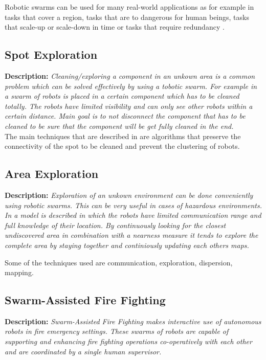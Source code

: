 Robotic swarms can be used for many real-world applications as for example in tasks that cover a region, tasks that are to dangerous for human beings, tasks that scale-up or scale-down in time or tasks that require redundancy \cite{csahin2005swarm}.

  \subsection{Spot Exploration}
  \textbf{Description: }\emph{Cleaning/exploring a component in an unkown area is a common problem which can be solved effectively by using a tobotic swarm. For example in \cite{wagner2008cooperative} a swarm of robots is placed in a certain component which has to be cleaned totally. The robots have limited visibility and can only see other robots within a certain distance. Main goal is to not disconnect the component that has to be cleaned to be sure that the component will be get fully cleaned in the end.} \\
  The main techniques that are described in \cite{wagner2008cooperative} are algorithms that preserve the connectivity of the spot to be cleaned and prevent the clustering of robots.
  
  \subsection{Area Exploration}
  \textbf{Description: }\emph{Exploration of an unkown environment can be done conveniently using robotic swarms. This can be very useful in cases of hazardous environments. In \cite{sheng2006distributed} a model is described in which the robots have limited communication range and full knowledge of their location. By continuously looking for the closest undiscovered area in combination with a nearness measure it tends to explore the complete area by staying together and continiously updating each others maps.} 
  
  Some of the techniques used are communication, exploration, dispersion, mapping. \cite{sheng2006distributed}
  
  \subsection{Swarm-Assisted Fire Fighting}
  \textbf{Description: }\emph{Swarm-Assisted Fire Fighting makes interactive use of autonomous robots in fire emergency settings. These swarms of robots are capable of supporting and enhancing fire fighting operations co-operatively with each other and are coordinated by a single human supervisor.}\cite{Naghsh2008,Penders2011}\\


